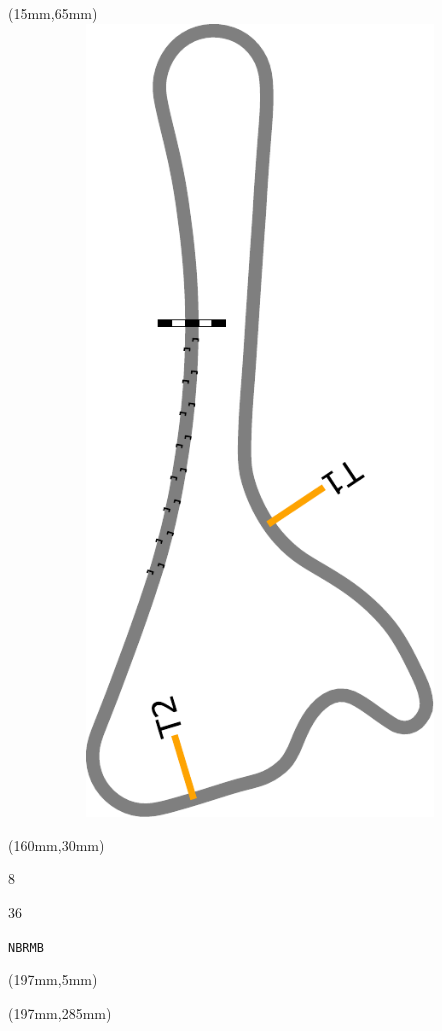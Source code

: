 \begin{textblock*}{185mm}(15mm,65mm)%
\centering
\mbox{\includegraphics[width=185mm,height=210mm,keepaspectratio]{PT/NBRMB.pdf}}
\end{textblock*}
\begin{textblock*}{40mm}(160mm,30mm)%
\Large
\par{} 
\par8 
\par36 
\par\hfill\tiny\tt NBRMB\\
\end{textblock*}
\begin{textblock*}{20mm}(197mm,5mm)%
\fbox{\thepage}
\label{NBRMB}
\end{textblock*}
\begin{textblock*}{20mm}(197mm,285mm)%
\fbox{\thepage}
\end{textblock*}

